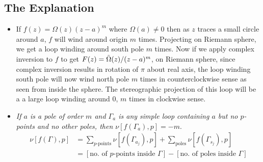 \documentclass[12pt]{article}
\def\tt{\textit}
\def\td{\ensuremath\tilde}
\begin{document}
\subsection{The Explanation}
\begin{itemize}
    \item If $f(z)=\Omega(z)(z-a)^m$ where $\Omega(a)\neq 0$ then as $z$ traces a small circle around $a$, $f$ will wind around origin $m$ times. Projecting on Riemann sphere, we get a loop winding around south pole $m$ times. Now if we apply complex inversion to $f$ to get $F(z)=\td{\Omega}(z)/(z-a)^m$, on Riemann sphere, since complex inversion results in rotation of $\pi$ about real axis, the loop winding south pole will now wind north pole $m$ times in counterclockwise sense as seen from inside the sphere. The stereographic projection of this loop will be a a large loop winding around $0$, $m$ times in clockwise sense.
    \item \tt{If $a$ is a pole of order $m$ and $\Gamma_a$ is any simple loop containing $a$ but no $p$-points and no other poles, then $\nu[f(\Gamma_a),p] = -m$}.
    \begin{align*}
        \nu[f(\Gamma),p] &= \sum_{p\text{-points}}\nu[f(\Gamma_{a_j}),p] + \sum_{\text{poles}}\nu[f(\Gamma_{s_j}),p]\\
        &= [\text{no. of $p$-points inside $\Gamma$}] - [\text{no. of poles inside $\Gamma$}]
    \end{align*}
\end{itemize}
\end{document}
